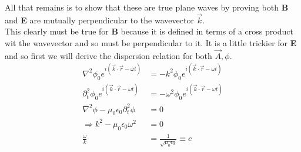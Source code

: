 \documentclass[a4paper, 11pt]{article}
\begin{document}
All that remains is to show that these are true plane waves by proving both \textbf{B} and \textbf{E} are mutually perpendicular to the wavevector $\vec{k}$.\\ 

\noindent This clearly must be true for \textbf{B} because it is defined in terms of a cross product wit the wavevector and so must be perpendicular to it. It is a little trickier for \textbf{E} and so first we will derive the dispersion relation for both $\vec{A}, \phi$. 
	\begin{align*}
		\nabla^2\phi_0e^{i(\vec{k}\cdot\vec{r}-\omega t)} &= -k^2\phi_0e^{i(\vec{k}\cdot\vec{r}-\omega t)} \\ 
		\partial_t^2\phi_0e^{i(\vec{k}\cdot\vec{r}-\omega t)} &= -\omega^2\phi_0e^{i(\vec{k}\cdot\vec{r}-\omega t)} \\
		\nabla^2\phi -\mu_0\epsilon_0\partial_t^2\phi &= 0 \\
		\Rightarrow k^2-\mu_0\epsilon_0\omega^2 &= 0 \\
		\frac{\omega}{k} &= \frac{1}{\sqrt{\mu_0\epsilon_0}} \equiv c 
	\end{align*}
	
\end{document}
